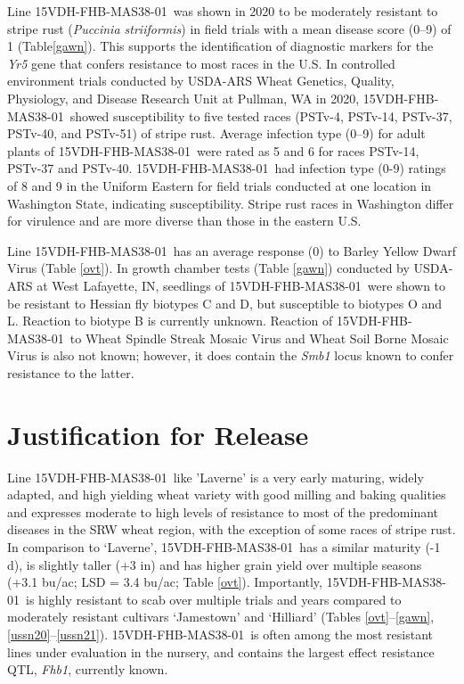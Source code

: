 \documentclass[12pt, letterpaper]{article}
\newcommand{\lin}{15VDH-FHB-MAS38-01~}
\begin{document}
Line \lin was shown in 2020 to be moderately resistant to stripe rust (\textit{Puccinia striiformis}) in field trials with a mean disease score (0--9) of 1 (Table\ref{gawn}). This supports the identification of diagnostic markers for the \textit{Yr5} gene that confers resistance to most races in the U.S. In controlled environment trials conducted by USDA-ARS Wheat Genetics, Quality, Physiology, and Disease Research Unit at Pullman, WA in 2020, \lin showed susceptibility to five tested races (PSTv-4, PSTv-14, PSTv-37, PSTv-40, and PSTv-51) of stripe rust. Average infection type (0--9) for adult plants of \lin were rated as 5 and 6 for races PSTv-14, PSTv-37 and PSTv-40. \lin had infection type (0-9) ratings of 8 and 9 in the Uniform Eastern for field trials conducted at one location in Washington State, indicating susceptibility. Stripe rust races in Washington differ for virulence and are more diverse than those in the eastern U.S.

Line \lin has an average response (0) to Barley Yellow Dwarf Virus (Table \ref{ovt}). In growth chamber tests (Table \ref{gawn}) conducted by USDA-ARS at West Lafayette, IN, seedlings of \lin were shown to be resistant to Hessian fly biotypes C and D, but susceptible to biotypes O and L. Reaction to biotype B is currently unknown. Reaction of \lin to Wheat Spindle Streak Mosaic Virus and Wheat Soil Borne Mosaic Virus is also not known; however, it does contain the \textit{Smb1} locus known to confer resistance to the latter. 



\section{Justification for Release}

Line \lin like 'Laverne' is a very early maturing, widely adapted, and high yielding wheat variety with good milling and baking qualities and expresses moderate to high levels of resistance to most of the predominant diseases in the SRW wheat region, with the exception of some races of stripe rust. In comparison to `Laverne', \lin has a similar maturity (-1 d), is slightly taller (+3 in) and has higher grain yield over multiple seasons (+3.1 bu/ac; LSD = 3.4 bu/ac; Table \ref{ovt}). Importantly, \lin is highly resistant to scab over multiple trials and years compared to moderately resistant cultivars `Jamestown' and `Hilliard' (Tables \ref{ovt}--\ref{gawn}, \ref{ussn20}--\ref{ussn21}). \lin is often among the most resistant lines under evaluation in the nursery, and contains the largest effect resistance QTL, \textit{Fhb1}, currently known.  
\end{document}

